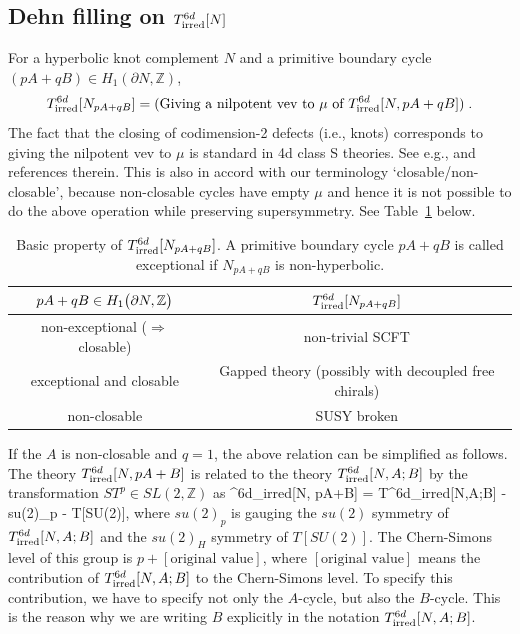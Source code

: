 \documentclass[a4paper,11pt]{article}
\def\BZ{{\mathbb Z}}
\def\beq#1\eeq{\begin{align}#1\end{align}}
\begin{document}



\subsection{Dehn filling on $T^{6d}_{\rm irred}[N]$}
%

For a hyperbolic knot complement $N$ and  a primitive boundary  cycle $(pA+qB) \in H_1 (\partial N, \mathbb{Z})$,
%
\begin{align}
T^{6d}_{\rm irred}[N_{pA+qB}] = (\textrm{Giving a nilpotent vev to  $\mu$ of  $T^{6d}_{\rm irred}[N,pA+qB]$})\;.
\end{align}
%
The fact that the closing of codimension-2 defects (i.e., knots) corresponds to giving the nilpotent vev to $\mu$
is standard in 4d class S theories. See e.g., \cite{Tachikawa:2013kta} and references therein.
This is also in accord with our terminology `closable/non-closable', because non-closable cycles have empty $\mu$ and hence
it is not possible to do the above operation while preserving supersymmetry. See Table~\ref{table:closing} below.
%
\begin{table}[h!]
\centering
\begin{tabular}{|c || c | }
\hline
$pA+qB \in H_1 \big{(}\partial N,\mathbb{Z}\big{)}$ & $T^{6d}_{\rm irred}[N_{pA+qB}]$
\\
\hline
\hline
non-exceptional ($\Rightarrow$ closable) &  non-trivial SCFT  \\\hline
exceptional and closable & Gapped theory (possibly with decoupled free chirals)  \\
\hline
non-closable & SUSY broken   \\
\hline
\end{tabular}
\caption{Basic property of $T^{6d}_{\rm irred}[N_{pA+qB}]$. A primitive boundary cycle $pA+qB$ is called exceptional if $N_{pA+qB}$ is non-hyperbolic.}\label{table:closing}
\end{table}
%


If the $A$  is non-closable and $q=1$, the above relation can be simplified as follows.
The theory $T^{6d}_{\rm irred}[N, pA+B] $ is related to the theory $T^{6d}_{\rm irred}[N,A;B] $ by the transformation $ST^p \in SL(2,\BZ)$ as
\beq
T^{6d}_{\rm irred}[N, pA+B] = T^{6d}_{\rm irred}[N,A;B] - su(2)_p - T[SU(2)],
\eeq
where $su(2)_p$ is gauging the $su(2)$ symmetry of $T^{6d}_{\rm irred}[N,A;B] $ and the $su(2)_H$ symmetry of $T[SU(2)]$.
The Chern-Simons level of this group is $p+[\text{original value}]$, where $[\text{original value}]$ means the contribution 
of $T^{6d}_{\rm irred}[N,A;B] $ to the Chern-Simons level. 
To specify this contribution, we have to specify not only the $A$-cycle, but also the $B$-cycle. This is the reason why we are writing $B$ explicitly in
the notation $T^{6d}_{\rm irred}[N,A;B] $.
\end{document}
